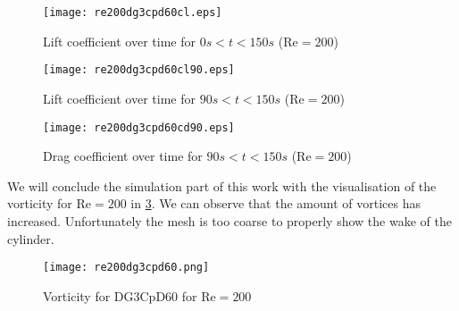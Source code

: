 \begin{figure}[htp]	
	\centering
	\texttt{[image: re200dg3cpd60cl.eps]}
	\caption{Lift coefficient over time for $0s<t<150s$ ($\text{Re}=200$)}
	\label{osci200}	
\end{figure}
\begin{figure}[htp]	
	\begin{minipage}[b]{0.45\textwidth}
		\centering
		\texttt{[image: re200dg3cpd60cl90.eps]}
		\caption{Lift coefficient over time for $90s<t<150s$ ($\text{Re}=200$)}
		\label{cl90}
	\end{minipage}
	\quad
	\begin{minipage}[b]{0.45\textwidth}
		\centering
		\texttt{[image: re200dg3cpd60cd90.eps]}
		\caption{Drag coefficient over time for $90s<t<150s$ ($\text{Re}=200$)}
		\label{cdosci200}	
	\end{minipage}
\end{figure}
\newpage
We will conclude the simulation part of this work with the visualisation of the vorticity for $\text{Re}=200$ in \cref{fig:vorticity200}. We can observe that the amount of vortices has increased. Unfortunately the mesh is too coarse to properly show the wake of the cylinder.
\begin{figure}[htp]
	\centering
	\texttt{[image: re200dg3cpd60.png]}
	\caption{Vorticity for DG3CpD60 for $\text{Re} = 200$}
	\label{fig:vorticity200}
\end{figure}

